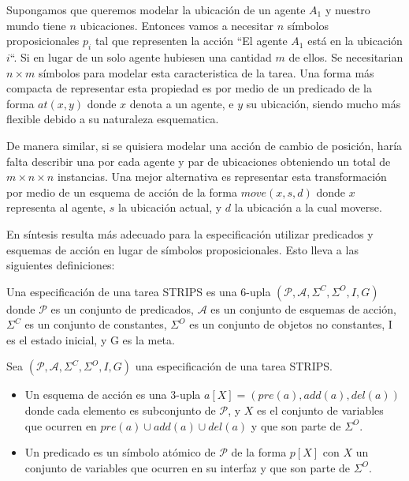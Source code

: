 Supongamos que queremos modelar la ubicación de un agente $A_1$ y nuestro mundo
tiene $n$ ubicaciones. Entonces vamos a necesitar $n$ símbolos proposicionales
$p_i$ tal que representen la acción ``El agente $A_1$ está en la ubicación
$i$``. Si en lugar de un solo agente hubiesen una cantidad $m$ de ellos. Se
necesitarian $n \times m$ símbolos para modelar esta caracteristica de la tarea.
Una forma más compacta de representar esta propiedad es por medio de un
predicado de la forma $at(x, y)$ donde $x$ denota a un agente, e $y$ su
ubicación, siendo mucho más flexible debido a su naturaleza esquematica.

De manera similar, si se quisiera modelar una acción de cambio de posición,
haría falta describir una por cada agente y par de ubicaciones obteniendo un
total de $m \times n \times n$ instancias. Una mejor alternativa es representar
esta transformación por medio de un esquema de acción de la forma $move(x, s,
d)$ donde $x$ representa al agente, $s$ la ubicación actual, y $d$ la ubicación
a la cual moverse.

En síntesis resulta más adecuado para la especificación utilizar predicados y
esquemas de acción en lugar de símbolos proposicionales. Esto lleva a las
siguientes definiciones:

\begin{mydef}
    Una especificación de una tarea STRIPS es una 6-upla $(\mathcal{P},
    \mathcal{A}, \Sigma^{C}, \Sigma^{O}, I, G)$  donde $\mathcal{P}$ es un
    conjunto de predicados, $\mathcal{A}$ es un conjunto de esquemas
    de acción, $\Sigma^{C}$ es un conjunto de constantes, $\Sigma^{O}$ es un
    conjunto de objetos no constantes, I es el estado inicial, y G es la meta.
\end{mydef}

\begin{mydef}
    Sea $(\mathcal{P}, \mathcal{A}, \Sigma^{C}, \Sigma^{O}, I, G)$ una
    especificación de una tarea STRIPS.

    \begin{itemize}
        \item Un esquema de acción es una 3-upla $a[X] = (pre(a), add(a),
        del(a))$ donde cada elemento es subconjunto de $\mathcal{P}$, y $X$ es el
        conjunto de variables que ocurren en $pre(a) \cup add(a) \cup del(a)$ y
        que son parte de $\Sigma^{O}$.
        \item Un predicado es un símbolo atómico de $\mathcal{P}$ de la forma
        $p[X]$ con $X$ un conjunto de variables que ocurren en su interfaz y
        que son parte de $\Sigma^{O}$.
    \end{itemize}
\end{mydef}

